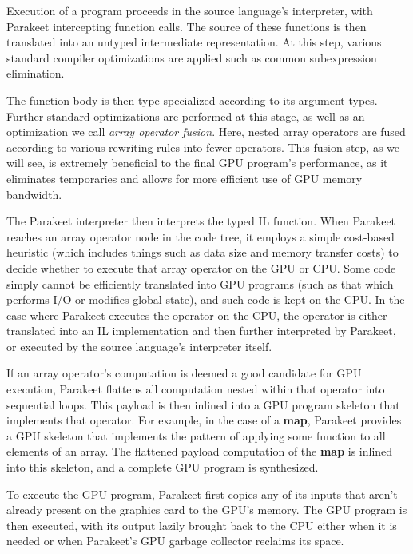 \documentclass[preprint]{sigplanconf}
\begin{document}
Execution of a program proceeds in the source language's interpreter, with
Parakeet intercepting function calls.  The source of these functions is then
translated into an untyped intermediate representation. At this step,
various standard compiler optimizations are applied such as common subexpression
elimination.

The function body is then type specialized according to its argument
types.  Further standard optimizations are performed at this stage, as well as
an optimization we call \emph{array operator fusion}.  Here, nested array
operators are fused according to various rewriting rules into fewer operators.
This fusion step, as we will see, is extremely beneficial to the final GPU
program's performance, as it eliminates temporaries and allows for more
efficient use of GPU memory bandwidth.

The Parakeet interpreter then interprets the typed IL function.  When
Parakeet reaches an array operator node in the code tree, it employs a simple
cost-based heuristic (which includes things such as data size and memory
transfer costs) to decide whether to execute that array operator on the GPU or
CPU.  Some code simply cannot be efficiently translated into GPU programs
(such as that which performs I/O or modifies global state), and such code is
kept on the CPU. In the case where Parakeet executes the operator on the CPU,
the operator is either translated into an IL implementation and then further
interpreted by Parakeet, or executed by the source language's interpreter
itself.

If an array operator's computation is deemed a good candidate for GPU
execution, Parakeet flattens all computation nested within that operator
into sequential loops.  This payload is then inlined into a GPU
program skeleton that implements that operator.  For example, in the case of a
\textbf{map}, Parakeet provides a GPU skeleton that implements the pattern of
applying some function to all elements of an array.  The
flattened payload computation of the \textbf{map} is inlined into this
skeleton, and a complete GPU program is synthesized.

To execute the GPU program, Parakeet first copies any of its inputs
that aren't already present on the graphics card to the GPU's memory.  The GPU
program is then executed, with its output lazily brought back to the CPU either
when it is needed or when Parakeet's GPU garbage collector reclaims its space.
\end{document}
